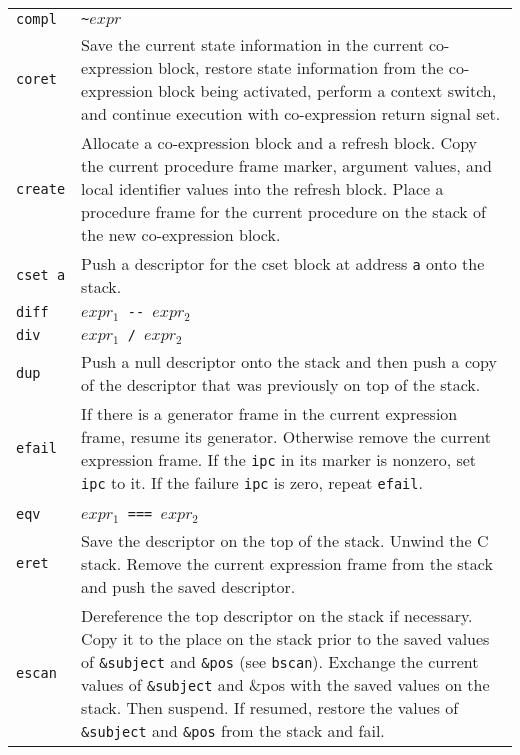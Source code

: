 \begin{supertabular}{l@{\hspace{1.5cm}}p{13.5cm}}
\texttt{compl} & \texttt{\textasciitilde $expr$}\\

\texttt{coret} & Save the current state information in the current
co-expression block, restore state information from the co-expression
block being activated, perform a context switch, and continue
execution with co-expression return signal set.\\

\texttt{create} & Allocate a co-expression block and a refresh block. Copy the
current procedure frame marker, argument values, and local identifier
values into the refresh block. Place a procedure frame for the current
procedure on the stack of the new co-expression block.\\

\texttt{cset a} & Push a descriptor for the cset block at address \texttt{a}
onto the stack.\\

\texttt{diff}  & \texttt{$expr_1$ -{}- $expr_2$}\\

\texttt{div}   & \texttt{$expr_1$ / $expr_2$}\\

\texttt{dup}   & Push a null descriptor onto the stack and then push a copy of
the descriptor that was previously on top of the stack.\\

\texttt{efail} & If there is a generator frame in the current expression
frame, resume its generator. Otherwise remove the current expression
frame. If the \texttt{ipc} in its marker is nonzero, set \texttt{ipc} to it. If the
failure \texttt{ipc} is zero, repeat \texttt{efail}.\\

\\

\texttt{eqv}   & \texttt{$expr_1$ === $expr_2$}\\

\texttt{eret}  & Save the descriptor on the top of the stack. Unwind the C
stack. Remove the current expression frame from the stack and push the
saved descriptor.\\

\texttt{escan} & Dereference the top descriptor on the stack if necessary. Copy
it to the place on the stack prior to the saved values of \texttt{\&subject} and
\texttt{\&pos} (see \texttt{bscan}). Exchange the current values of
\texttt{\texttt{\&subject}} and \&pos with the saved values on the stack. Then
suspend. If resumed, restore the values of \texttt{\&subject} and \texttt{\&pos}
from the stack and fail.\\


\end{supertabular}
